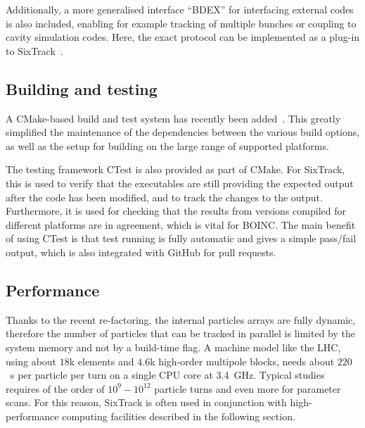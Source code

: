 \documentclass{ws-ijmpa}
\begin{document}
Additionally, a more generalised interface ``BDEX'' for interfacing external codes is also included, enabling for example tracking of multiple bunches or coupling to cavity simulation codes.
Here, the exact protocol can be implemented as a plug-in to SixTrack~\cite{recentDevels2}.


\subsection{Building and testing}

A CMake-based build and test system has recently been added~\cite{recentDevels2}. This greatly simplified the maintenance of the dependencies between the various build options, as well as the setup for building on the large range of supported platforms.

The testing framework CTest is also provided as part of CMake. For SixTrack, this is used to verify that the executables are still providing the expected output after the code has been modified, and to track the changes to the output. Furthermore, it is used for checking that the results from versions compiled for different platforms are in agreement, which is vital for BOINC. The main benefit of using CTest is that test running is fully automatic and gives a simple pass/fail output, which is also integrated with GitHub for pull requests.

\subsection{Performance}

Thanks to the recent re-factoring, the internal particles arrays are fully dynamic, therefore the number of particles that can be tracked in parallel is limited by the system memory and not by a build-time flag. A machine model like the LHC, using about $18$k elements and $4.6$k high-order multipole blocks, needs about $220$~\textmu s per particle per turn on a single CPU core at 3.4~GHz. Typical studies requires of the order of $10^9 - 10^{12}$ particle turns and even more for parameter scans. For this reason, SixTrack is often used in conjunction with high-performance computing facilities described in the following section.
\end{document}
